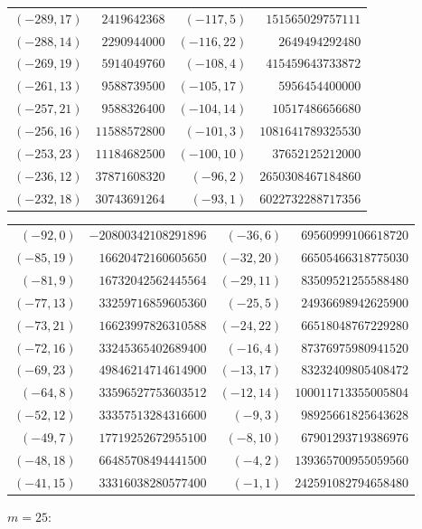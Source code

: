 \documentclass[11pt]{amsart}
\theoremstyle{definition}
\begin{document}
{\begin{tabular}{@{}r@{\ \ }r@{\qquad}r@{\ \ }r@{}}
$(-289,17)$ & $2419642368$ & $(-117,5)$ & $151565029757111$ \\
$(-288,14)$ & $2290944000$ & $(-116,22)$ & $2649494292480$ \\
$(-269,19)$ & $5914049760$ & $(-108,4)$ & $415459643733872$ \\
$(-261,13)$ & $9588739500$ & $(-105,17)$ & $5956454400000$ \\
$(-257,21)$ & $9588326400$ & $(-104,14)$ & $10517486656680$ \\
$(-256,16)$ & $11588572800$ & $(-101,3)$ & $1081641789325530$ \\
$(-253,23)$ & $11184682500$ & $(-100,10)$ & $37652125212000$ \\
$(-236,12)$ & $37871608320$ & $(-96,2)$ & $2650308467184860$ \\
$(-232,18)$ & $30743691264$ & $(-93,1)$ & $6022732288717356$ \\
\end{tabular}}\par
{\scriptsize\begin{tabular}{@{}r@{\ \ }r@{\qquad}r@{\ \ }r@{}}
$(-92,0)$ & $-20800342108291896$ & $(-36,6)$ & $69560999106618720$ \\
$(-85,19)$ & $16620472160605650$ & $(-32,20)$ & $66505466318775030$ \\
$(-81,9)$ & $16732042562445564$ & $(-29,11)$ & $83509521255588480$ \\
$(-77,13)$ & $33259716859605360$ & $(-25,5)$ & $24936698942625900$ \\
$(-73,21)$ & $16623997826310588$ & $(-24,22)$ & $66518048767229280$ \\
$(-72,16)$ & $33245365402689400$ & $(-16,4)$ & $87376975980941520$ \\
$(-69,23)$ & $49846214714614900$ & $(-13,17)$ & $83232409805408472$ \\
$(-64,8)$ & $33596527753603512$ & $(-12,14)$ & $100011713355005804$ \\
$(-52,12)$ & $33357513284316600$ & $(-9,3)$ & $98925661825643628$ \\
$(-49,7)$ & $17719252672955100$ & $(-8,10)$ & $67901293719386976$ \\
$(-48,18)$ & $66485708494441500$ & $(-4,2)$ & $139365700955059560$ \\
$(-41,15)$ & $33316038280577400$ & $(-1,1)$ & $242591082794658480$ \\
\end{tabular}}\par\medskip
\noindent$m=25$:\nopagebreak\\[2pt]
\end{document}
